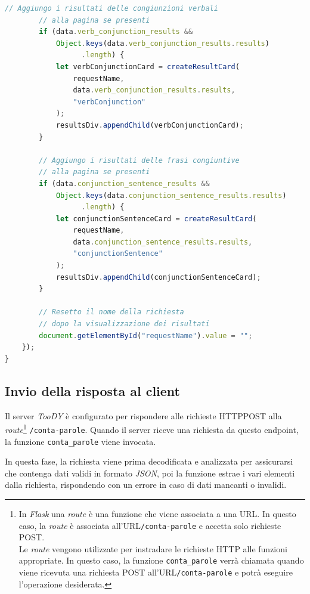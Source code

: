 \documentclass[12pt]{report}
\newcommand{\toody}{\textsl{TooDY}\xspace}
\newcommand{\flask}{\textsl{Flask}\xspace}
\newcommand{\json}{\textsl{JSON}\xspace}
\newcommand{\URL}{\textsf{URL}\xspace}
\newcommand{\http}{\textsf{HTTP}\xspace}
\newcommand{\post}{\textsf{POST}\xspace}
\begin{document}
\begin{lstlisting}[language=JavaScript]
        // Aggiungo i risultati delle congiunzioni verbali
        // alla pagina se presenti
        if (data.verb_conjunction_results &&
            Object.keys(data.verb_conjunction_results.results)
                  .length) {
            let verbConjunctionCard = createResultCard(
                requestName,
                data.verb_conjunction_results.results,
                "verbConjunction"
            );
            resultsDiv.appendChild(verbConjunctionCard);
        }

        // Aggiungo i risultati delle frasi congiuntive
        // alla pagina se presenti
        if (data.conjunction_sentence_results &&
            Object.keys(data.conjunction_sentence_results.results)
                  .length) {
            let conjunctionSentenceCard = createResultCard(
                requestName,
                data.conjunction_sentence_results.results,
                "conjunctionSentence"
            );
            resultsDiv.appendChild(conjunctionSentenceCard);
        }

        // Resetto il nome della richiesta
        // dopo la visualizzazione dei risultati
        document.getElementById("requestName").value = "";
    });
}
\end{lstlisting}




\subsection{Invio della risposta al client}
Il server \toody è configurato per rispondere alle richieste \http \post alla \textit{route}\footnote{In \flask una \textit{route} è una funzione che viene associata a una \URL. In questo caso, la \textit{route} è associata all'\URL \texttt{/conta-parole} e accetta solo richieste \post.\\
Le \textit{route} vengono utilizzate per instradare le richieste \http alle funzioni appropriate. In questo caso, la funzione \texttt{conta\_parole} verrà chiamata quando viene ricevuta una richiesta \post all'\URL \texttt{/conta-parole} e potrà eseguire l'operazione desiderata.} \texttt{/conta-parole}. Quando il server riceve una richiesta da questo endpoint, la funzione \texttt{conta\_parole} viene invocata.

In questa fase, la richiesta viene prima decodificata e analizzata per assicurarsi che contenga dati validi in formato \json, poi la funzione estrae i vari elementi dalla richiesta, rispondendo con un errore in caso di dati mancanti o invalidi.
\end{document}
